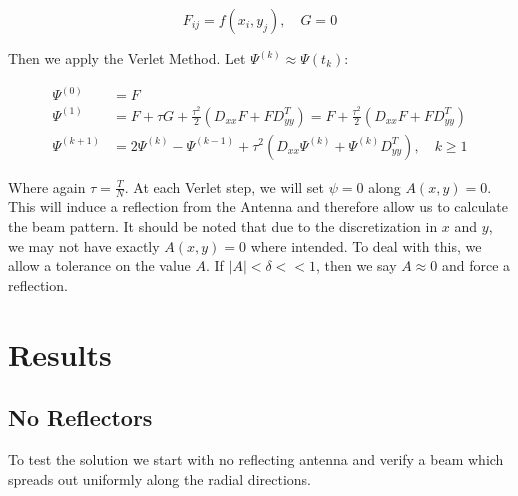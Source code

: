 \documentclass{article}
\begin{document}
$$F_{ij} = f(x_i,y_j), \quad G = 0$$

Then we apply the Verlet Method.  Let $\Psi^{(k)} \approx \Psi(t_k)$:

\begin{equation}
    \label{eq:verlet-integration}
    \begin{split}
      \Psi^{(0)} & = F \\
      \Psi^{(1)} & = F + \tau G +
      \frac{\tau^2}{2} \left(D_{xx} F + F D_{yy}^T\right) =
      F + \frac{\tau^2}{2}\left(D_{xx} F + F D_{yy}^T \right) \\
      \Psi^{(k+1)} & = 2\Psi^{(k)} - \Psi^{(k-1)} +
      \tau^2 \left(D_{xx} \Psi^{(k)} + \Psi^{(k)}D_{yy}^T \right), \quad
      k \geq 1
    \end{split}
\end{equation}

Where again $\tau = \frac{T}{N}$.  At each Verlet step, we will set
$\psi = 0$ along $A(x,y) = 0$.  This will induce a reflection from the Antenna
and therefore allow us to calculate the beam pattern.  It should be noted that
due to the discretization in $x$ and $y$, we may not have exactly $A(x,y) = 0$
where intended.  To deal with this, we allow a tolerance on the value $A$.
If $|A| < \delta << 1$, then we say $A \approx 0$ and force a reflection.


\section{Results}

\subsection{No Reflectors}

To test the solution we start with no reflecting antenna and verify a beam
which spreads out uniformly along the radial directions.
\end{document}
